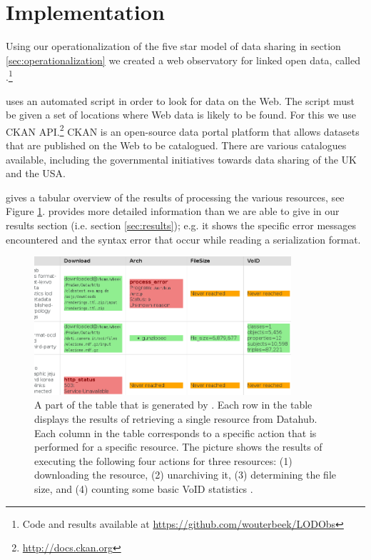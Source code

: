 \section{Implementation}
\label{sec:implementation}

Using our operationalization of the five star model of data sharing
 in section \ref{sec:operationalization} we created
 a web observatory for linked open data,
 called \obs.\footnote{Code and results available at
   \url{https://github.com/wouterbeek/LODObs}}

\obs uses an automated script in order to look for
 data on the Web.
The script must be given a set of locations where Web data
 is likely to be found.
For this we use CKAN API.\footnote{\url{http://docs.ckan.org}}
CKAN is an open-source data portal platform
 that allows datasets that are published on the Web to be catalogued.
There are various catalogues available,
 including the governmental initiatives towards data sharing
 of the UK and the USA.

\obs gives a tabular overview of the results of
 processing the various resources, see Figure \ref{fig:lod_observer}.
\obs provides more detailed information than we are able to give
 in our results section (i.e. section \ref{sec:results});
 e.g. it shows the specific error messages encountered
 and the syntax error that occur while reading a serialization format.

\begin{figure}[th!]
  \label{fig:lod_observer}
  \centering
  \includegraphics[width=0.85\textwidth]{./img/table}
  \caption{
    A part of the table that is generated by \obs.
    Each row in the table displays the results of retrieving a single
     resource from Datahub.
    Each column in the table corresponds to a specific action
     that is performed for a specific resource.
    The picture shows the results of executing the following four actions
     for three resources:
     (1) downloading the resource,
     (2) unarchiving it,
     (3) determining the file size, and
     (4) counting some basic VoID statistics \cite{Void2011}.
  }
\end{figure}

